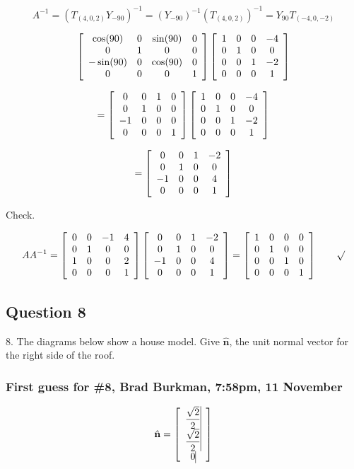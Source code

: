 \documentclass[11pt]{article}
\begin{document}
\begin{spacing}{1.2}
$$A^{-1}= \left(T_{(4,0,2)} Y_{-90}\right)^{-1} = 
\left( Y_{-90} \right)^{-1}\left( T_{(4,0,2)}\right)^{-1} = 
Y_{90} T_{(-4,0,-2)}
$$

$$
\left[
	\begin{array}{cccc}
		\cos (90) & 0 & \sin (90) & 0 \cr
		0 & 1 & 0 & 0 \cr
		-\sin(90) & 0 & \cos (90) & 0 \cr
		0 & 0 & 0 & 1 \cr
	\end{array}
\right]
\left[
\begin{array}{cccc}
	1 & 0 & 0 & -4 \cr
	0 & 1 & 0 & 0 \cr
	0 & 0 & 1 & -2 \cr
	0 & 0 & 0 & 1 \cr
\end{array}
\right]
$$

$$= 
\left[
	\begin{array}{cccc}
		0 & 0 & 1 & 0 \cr
		0 & 1 & 0 & 0 \cr
		-1 & 0 & 0 & 0 \cr
		0 & 0 & 0 & 1 \cr
	\end{array}
\right]
\left[
\begin{array}{cccc}
	1 & 0 & 0 & -4 \cr
	0 & 1 & 0 & 0 \cr
	0 & 0 & 1 & -2 \cr
	0 & 0 & 0 & 1 \cr
\end{array}
\right]
$$

$$= 
\left[
	\begin{array}{cccc}
		0 & 0 & 1 & -2 \cr
		0 & 1 & 0 & 0 \cr
		-1 & 0 & 0 & 4 \cr
		0 & 0 & 0 & 1 \cr
	\end{array}
\right]
$$

Check.  

$$ A A^{-1} = \left[
	\begin{array}{cccc}
		0 & 0 & -1 & 4 \cr
		0 & 1 & 0 & 0 \cr
		1 & 0 & 0 & 2 \cr
		0 & 0 & 0 & 1 \cr
	\end{array}
\right]
\left[
	\begin{array}{cccc}
		0 & 0 & 1 & -2 \cr
		0 & 1 & 0 & 0 \cr
		-1 & 0 & 0 & 4 \cr
		0 & 0 & 0 & 1 \cr
	\end{array}
\right]
=
\left[
	\begin{array}{cccc}
		1 & 0 & 0 & 0 \cr
		0 & 1 & 0 & 0 \cr
		0 & 0 & 1 & 0 \cr
		0 & 0 & 0 & 1 \cr
	\end{array}
\right]
\qquad \surd
$$



\subsection{Question 8}
8.  The diagrams below show a house model.  Give $\hat{\mathbf{n}}$, the unit normal vector for the right side of the roof.  

\subsubsection{First guess for \#8, Brad Burkman, 7:58pm, 11 November}
$$\hat{\mathbf{n}} = 
\left[
\begin{array}{>{\displaystyle}c<{\vrule width 0pt height 24pt depth 8pt}}
	 \frac{\sqrt2}{2}\cr
	 \frac{\sqrt2}{2}\cr
	 0 
\end{array}
\right]
$$


\end{spacing}
\end{document}
